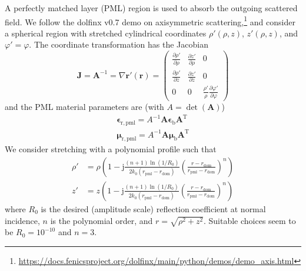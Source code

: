 \documentclass[a4paper,12pt]{article}
\renewcommand{\vec}[1]{\boldsymbol{#1}}
\newcommand{\mrm}[1]{\mathrm{#1}}
\newcommand{\mat}[1]{\mathbf{#1}}
\newcommand{\ju}{\mrm{j}}
\newcommand{\rv}{\vec{r}}
\newcommand{\epsm}{\boldsymbol{\epsilon}}
\newcommand{\mum}{\boldsymbol{\mu}}
\begin{document}
A perfectly matched layer (PML) region is used to absorb the outgoing
scattered field. We follow the dolfinx v0.7 demo on axisymmetric
scattering,\footnote{\url{https://docs.fenicsproject.org/dolfinx/main/python/demos/demo_axis.html}}
and consider a spherical region with stretched cylindrical coordinates
$\rho'(\rho,z)$, $z'(\rho,z)$, and $\varphi'=\varphi$. The coordinate
transformation has the Jacobian
\begin{equation}
  \mat{J} = \mat{A}^{-1} = \nabla\rv'(\rv) =
  \begin{pmatrix}
    \frac{\partial\rho'}{\partial\rho} & \frac{\partial z'}{\partial\rho} & 0 \\
    \frac{\partial\rho'}{\partial z} & \frac{\partial z'}{\partial z} & 0 \\
    0 & 0 & \frac{\rho'}{\rho}\frac{\partial\varphi'}{\partial\varphi}
  \end{pmatrix}
\end{equation}
and the PML material parameters are (with
$A=\operatorname{det}(\mat{A})$) 
\begin{align}
  \epsm_{\mrm{r,pml}} = A^{-1} \mat{A} \boldsymbol{\epsilon}_{\mrm{b}} \mat{A}^{\mrm{T}} \\
  \mum_{\mrm{r,pml}} = A^{-1} \mat{A} \boldsymbol{\mu}_{\mrm{b}} \mat{A}^{\mrm{T}} 
\end{align}
We consider stretching with a polynomial profile such that
\cite[p. 663]{Taflove+etal2004}
\begin{align}
  \rho' &= \rho\left( 1 - \ju \frac{(n+1)\ln(1/R_{0})}{2k_{0}(r_{\mrm{pml}} - r_{\mrm{dom}})} \left(\frac{r-r_{\mrm{dom}}}{r_{\mrm{pml}} - r_{\mrm{dom}}}\right)^{n}\right) \\
  z' &= z\left( 1 - \ju \frac{(n+1)\ln(1/R_{0})}{2k_{0}(r_{\mrm{pml}} - r_{\mrm{dom}})} \left(\frac{r-r_{\mrm{dom}}}{r_{\mrm{pml}} - r_{\mrm{dom}}}\right)^{n}\right) 
\end{align}
where $R_{0}$ is the desired (amplitude scale) reflection coefficient
at normal incidence, $n$ is the polynomial order, and
$r = \sqrt{\rho^{2} + z^{2}}$. Suitable choices seem to be
$R_{0} = 10^{-10}$ and $n=3$.
\end{document}
